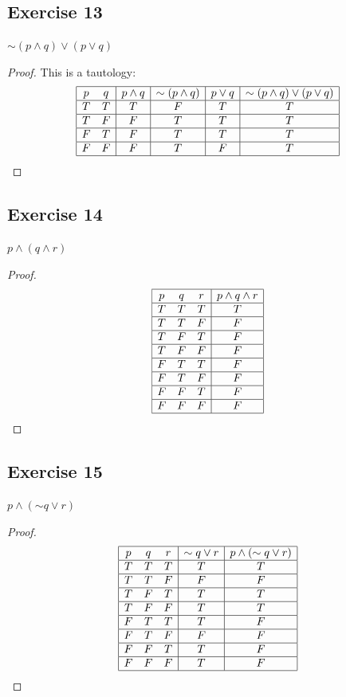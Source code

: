 \documentclass[14pt]{extarticle}
\begin{document}
\subsection{Exercise 13} ${\sim(p \wedge q)} \vee (p \vee q)$
\begin{proof} This is a tautology: $$ \begin{array}{|cc|c|c|c|c|c|} \hline p & q
& p \wedge q & {\sim (p \wedge q)} & p \vee q & {\sim(p \wedge q)} \vee (p \vee
q) \\ \hline T & T & T & F & T & T \\ \hline T & F & F & T & T & T \\ \hline F &
T & F & T & T & T \\ \hline F & F & F & T & F & T \\ \hline \end{array} $$
\end{proof}

\subsection{Exercise 14} $p \wedge (q \wedge r)$
\begin{proof} $$ \begin{array}{|ccc|c|} \hline p & q & r & p \wedge q \wedge r
\\ \hline T & T & T & T \\ \hline T & T & F & F \\ \hline T & F & T & F \\
\hline T & F & F & F \\ \hline F & T & T & F \\ \hline F & T & F & F \\ \hline F
& F & T & F \\ \hline F & F & F & F \\ \hline \end{array} $$ \end{proof}

\subsection{Exercise 15} $p \wedge ({\sim q} \vee r)$
\begin{proof} $$ \begin{array}{|ccc|c|c|} \hline p & q & r & {\sim q} \vee r & p
\wedge ({\sim q} \vee r) \\ \hline T & T & T & T & T \\ \hline T & T & F & F & F
\\ \hline T & F & T & T & T \\ \hline T & F & F & T & T \\ \hline F & T & T & T
& F \\ \hline F & T & F & F & F \\ \hline F & F & T & T & F \\ \hline F & F & F
& T & F \\ \hline \end{array} $$ \end{proof}
\end{document}
